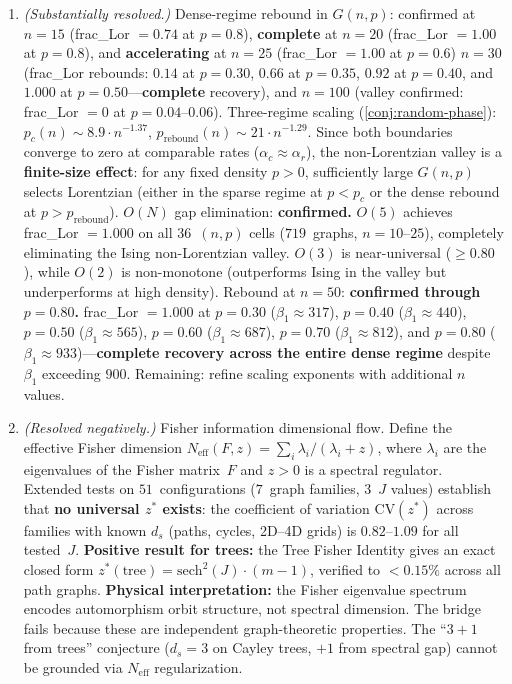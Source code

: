 \documentclass[11pt]{article}
\theoremstyle{definition}
\theoremstyle{remark}
\begin{document}
\begin{enumerate}
  \item \emph{(Substantially resolved.)} Dense-regime rebound in $G(n,p)$:
    confirmed at $n = 15$ (frac\_Lor $= 0.74$ at $p = 0.8$),
    \textbf{complete} at $n = 20$ (frac\_Lor $= 1.00$ at $p = 0.8$),
    and \textbf{accelerating} at $n = 25$ (frac\_Lor $= 1.00$ at $p = 0.6$)
    $n = 30$ (frac\_Lor rebounds: $0.14$ at $p = 0.30$, $0.66$ at $p = 0.35$,
    $0.92$ at $p = 0.40$, and $1.000$ at $p = 0.50$---\textbf{complete} recovery),
    and $n = 100$ (valley confirmed: frac\_Lor $= 0$ at $p = 0.04$--$0.06$).
    Three-regime scaling (\cref{conj:random-phase}):
    $p_c(n) \sim 8.9 \cdot n^{-1.37}$,
    $p_{\mathrm{rebound}}(n) \sim 21 \cdot n^{-1.29}$.
    Since both boundaries converge to zero at comparable rates
    ($\alpha_c \approx \alpha_r$), the non-Lorentzian valley is a
    \textbf{finite-size effect}: for any fixed density $p > 0$, sufficiently
    large $G(n,p)$ selects Lorentzian (either in the sparse regime at
    $p < p_c$ or the dense rebound at $p > p_{\mathrm{rebound}}$).
    $O(N)$ gap elimination: \textbf{confirmed.} $O(5)$ achieves
    frac\_Lor $= 1.000$ on all $36$~$(n,p)$ cells ($719$~graphs,
    $n = 10$--$25$), completely eliminating the Ising non-Lorentzian
    valley. $O(3)$ is near-universal ($\geq 0.80$), while $O(2)$ is
    non-monotone (outperforms Ising in the valley but underperforms
    at high density).
    Rebound at $n = 50$: \textbf{confirmed through $p = 0.80$.}
    frac\_Lor $= 1.000$ at $p = 0.30$ ($\beta_1 \approx 317$),
    $p = 0.40$ ($\beta_1 \approx 440$), $p = 0.50$
    ($\beta_1 \approx 565$), $p = 0.60$
    ($\beta_1 \approx 687$), $p = 0.70$
    ($\beta_1 \approx 812$), and $p = 0.80$
    ($\beta_1 \approx 933$)---\textbf{complete recovery across the
    entire dense regime} despite $\beta_1$ exceeding $900$.
    Remaining: refine scaling exponents with additional $n$ values.

  \item \emph{(Resolved negatively.)} Fisher information dimensional flow.
    Define the effective Fisher dimension
    $N_{\mathrm{eff}}(F, z) = \sum_i \lambda_i / (\lambda_i + z)$,
    where $\lambda_i$ are the eigenvalues of the Fisher matrix~$F$ and
    $z > 0$ is a spectral regulator.
    Extended tests on $51$~configurations ($7$~graph families,
    $3$~$J$ values) establish that \textbf{no universal $z^*$ exists}:
    the coefficient of variation $\mathrm{CV}(z^*)$ across families
    with known $d_s$ (paths, cycles, 2D--4D grids) is $0.82$--$1.09$
    for all tested~$J$.
    \textbf{Positive result for trees:}
    the Tree Fisher Identity gives an exact closed form
    $z^*(\text{tree}) = \mathrm{sech}^2(J) \cdot (m - 1)$,
    verified to $< 0.15\%$ across all path graphs.
    \textbf{Physical interpretation:} the Fisher eigenvalue spectrum
    encodes automorphism orbit structure, not spectral dimension.
    The bridge fails because these are independent graph-theoretic
    properties. The ``$3+1$ from trees'' conjecture
    ($d_s = 3$ on Cayley trees, $+ 1$ from spectral gap) cannot be
    grounded via $N_{\mathrm{eff}}$ regularization.


\end{enumerate}
\end{document}

